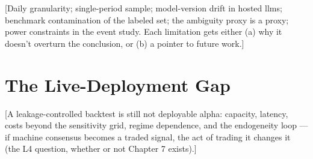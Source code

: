 [Daily granularity; single-period sample; model-version drift in
hosted \glspl{llm}; benchmark contamination of the labeled set; the
ambiguity proxy is a proxy; power constraints in the event study.
Each limitation gets either (a) why it doesn't overturn the
conclusion, or (b) a pointer to future work.]

\section{The Live-Deployment Gap}
\label{sec:disc-deployment}

[A leakage-controlled backtest is still not deployable alpha:
capacity, latency, costs beyond the sensitivity grid, regime
dependence, and the endogeneity loop --- if machine consensus becomes
a traded signal, the act of trading it changes it (the L4 question,
whether or not Chapter 7 exists).]
